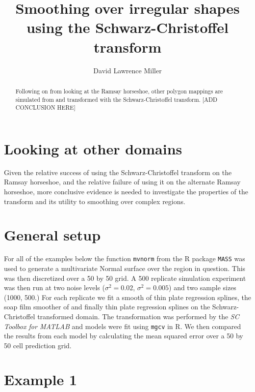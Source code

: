 \documentclass[a4paper,10pt]{amsart}
\title{Smoothing over irregular shapes using the Schwarz-Christoffel transform}
\author{David Lawrence Miller}
\newcommand{\sch}{Schwarz-Christoffel }
\begin{document}
\begin{abstract}
Following on from looking at the Ramsay horseshoe, other polygon mappings are simulated from and transformed with the \sch transform. [ADD CONCLUSION HERE]
\end{abstract}


\newtheorem{thm}{Theorem}[section]

\newtheorem{defn}{Definition}[section]

\maketitle



\section{Looking at other domains}

Given the relative success of using the \sch transform on the Ramsay horseshoe, and the relative failure of using it on the alternate Ramsay horseshoe, more conclusive evidence is needed to investigate the properties of the transform and its utility to smoothing over complex regions.





\section{General setup}

For all of the examples below the function \texttt{mvnorm} from the \textsf{R} package \texttt{MASS} was used to generate a  multivariate Normal surface over the region in question. This was then discretized over a 50 by 50 grid. A 500 replicate simulation experiment was then run at two noise levels ($\sigma^2=0.02$, $\sigma^2=0.005$) and two sample sizes (1000, 500.) For each replicate we fit a smooth of thin plate regression splines, the soap film smoother of \cite{soap} and finally thin plate regression splines on the \sch transformed domain. The transformation was performed by the \textit{SC Toolbox for MATLAB} and models were fit using \texttt{mgcv} in \textsf{R}. We then compared the results from each model by calculating the mean squared error over a 50 by 50 cell prediction grid.

\section{Example 1}
\end{document}
